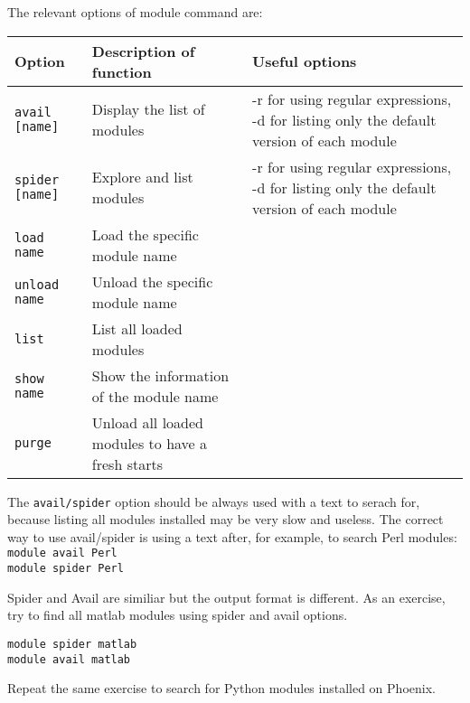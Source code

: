 The relevant options of module command are:
\begin{center}
	\renewcommand{\arraystretch}{1.6}
	\begin{tabular}{|p{4cm} | p{6.5cm} | p{4.5cm}|}
		\hline
		\textbf{Option} & \textbf{Description of function} & \textbf{Useful options} \\ \hline
		\texttt{avail [name]} & Display the list of modules & -r for using regular expressions, -d for listing only the default version of each module \\ \hline
		\texttt{spider [name]} & Explore and list modules & -r for using regular expressions, -d for listing only the default version of each module \\ \hline
		\texttt{load name} & Load the specific module name & \\ \hline
		\texttt{unload name} & Unload the specific module name &  \\ \hline
		\texttt{list} & List all loaded modules &   \\ \hline
		\texttt{show name} & Show the information of the module name &  \\ \hline
		\texttt{purge} & Unload all loaded modules to have a fresh starts &  \\ \hline
	\end{tabular}
\end{center}

\begin{steps}
The \texttt{avail/spider} option should be always used with a text to serach for, because listing all modules installed may be very slow and useless. 
The correct way to use avail/spider is using a text after, for example, to search Perl modules:\\

\texttt{module avail Perl}\\
\texttt{module spider Perl}\\
\end{steps}

\begin{note}
Spider and Avail are similiar but the output format is different. As an exercise, try to find all matlab modules using spider and avail options.
\end{note}

\begin{lstlisting}[style=command_syntax]
module spider matlab
module avail matlab
\end{lstlisting}

\begin{steps}
Repeat the same exercise to search for Python modules installed on Phoenix.
\end{steps}

